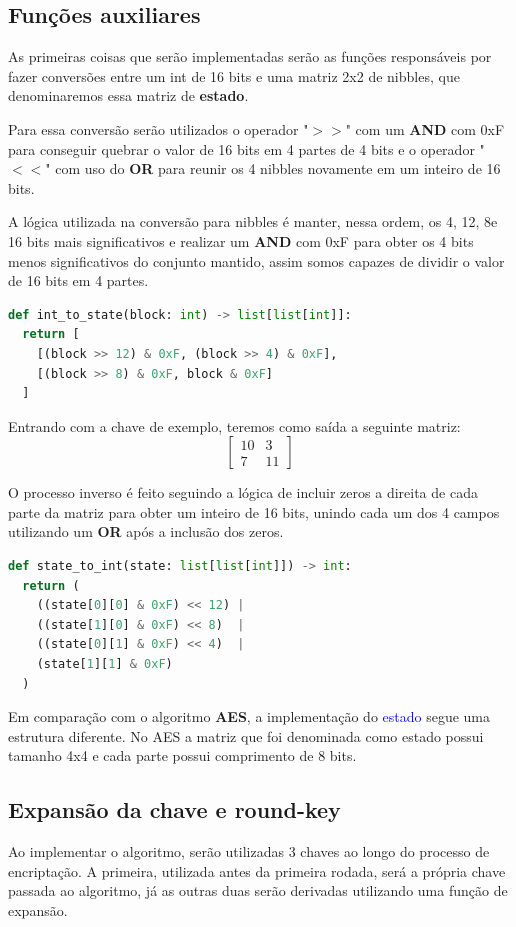 \documentclass[12pt]{article}
\newcommand{\blue}[1]{\textcolor{blue}{#1}}
\begin{document}
\subsection{Funções auxiliares}
\label{sec:funcoes_auxiliares}
As primeiras coisas que serão implementadas serão as funções responsáveis por fazer conversões entre um int de 16 bits e uma matriz 2x2 de nibbles, que denominaremos essa matriz de \textbf{estado}. 

Para essa conversão serão utilizados o operador "$>>$" com um \textbf{AND} com 0xF para conseguir quebrar o valor de 16 bits em 4 partes de 4 bits e o operador "$<<$" com uso do \textbf{OR} para reunir os 4 nibbles novamente em um inteiro de 16 bits.

A lógica utilizada na conversão para nibbles é manter, nessa ordem, os 4, 12, 8e 16 bits mais significativos e realizar um \textbf{AND} com 0xF para obter os 4 bits menos significativos do conjunto mantido, assim somos capazes de dividir o valor de 16 bits em 4 partes.

\begin{lstlisting}[language=Python]
def int_to_state(block: int) -> list[list[int]]:
  return [
    [(block >> 12) & 0xF, (block >> 4) & 0xF],
    [(block >> 8) & 0xF, block & 0xF]
  ]
\end{lstlisting}

Entrando com a chave de exemplo, teremos como saída a seguinte matriz:
$$
\begin{bmatrix}
10 & 3 \\
7 & 11 
\end{bmatrix}
$$

O processo inverso é feito seguindo a lógica de incluir zeros a direita de cada parte da matriz para obter um inteiro de 16 bits, unindo cada um dos 4 campos utilizando um \textbf{OR} após a inclusão dos zeros.

\begin{lstlisting}[language=Python]
def state_to_int(state: list[list[int]]) -> int:
  return (
    ((state[0][0] & 0xF) << 12) |
    ((state[1][0] & 0xF) << 8)  |
    ((state[0][1] & 0xF) << 4)  |
    (state[1][1] & 0xF)
  )
\end{lstlisting}

Em comparação com o algoritmo \textbf{AES}, a implementação do \blue{estado} segue uma estrutura diferente. No AES a matriz que foi denominada como estado possui tamanho 4x4 e cada parte possui comprimento de 8 bits.

\subsection{Expansão da chave e round-key}
Ao implementar o algoritmo, serão utilizadas 3 chaves ao longo do processo de encriptação. A primeira, utilizada antes da primeira rodada, será a própria chave passada ao algoritmo, já as outras duas serão derivadas utilizando uma função de expansão. 
\end{document}
